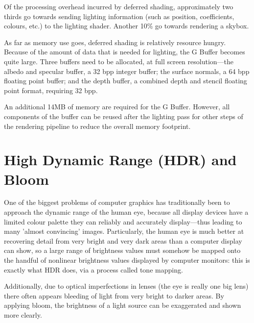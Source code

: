 \documentclass[11pt, oneside]{report}
\begin{document}
Of the processing overhead incurred by deferred shading, approximately two thirds go towards sending lighting information (such as position, coefficients, colours, etc.) to the lighting shader. Another 10\% go towards rendering a skybox.

As far as memory use goes, deferred shading is relatively resource hungry. Because of the amount of data that is needed for lighting, the \gls{G Buffer} becomes quite large. Three buffers need to be allocated, at full screen resolution---the albedo and \gls{specular} buffer, a 32 \gls{bpp} integer buffer; the surface normals, a 64 \gls{bpp} floating point buffer; and the depth buffer, a combined depth and stencil floating point format, requiring 32 \gls{bpp}.

An additional 14MB of memory are required for the \gls{G Buffer}. However, all components of the buffer can be reused after the lighting pass for other steps of the rendering pipeline to reduce the overall memory footprint.


\chapter{High Dynamic Range (HDR) and Bloom}
One of the biggest problems of computer graphics has traditionally been to approach the dynamic range of the human eye, because all display devices have a limited colour palette they can reliably and accurately display---thus leading to many 'almost convincing' images. Particularly, the human eye is much better at recovering detail from very bright and very dark areas than a computer display can show, so a large range of brightness values must somehow be mapped onto the handful of nonlinear brightness values displayed by computer monitors: this is exactly what \gls{HDR} does, via a process called \gls{tone mapping}.

Additionally, due to optical imperfections in lenses (the eye is really one big lens) there often appears bleeding of light from very bright to darker areas. By applying \gls{bloom}, the brightness of a light source can be exaggerated and shown more clearly.
\end{document}

